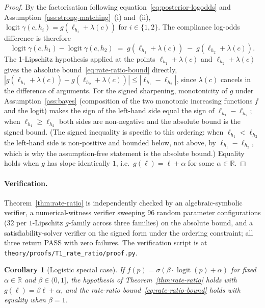 \documentclass[11pt]{article}
\newtheorem{corollary}{Corollary}
\theoremstyle{definition}
\theoremstyle{remark}
\begin{document}
\begin{proof}
By the factorisation following equation~\eqref{eq:posterior-logodds} and
Assumption~\ref{ass:strong-matching}~(i) and~(ii),
$\operatorname{logit} \gamma(c, h_i) = g(\ell_{h_i} + \lambda(c))$ for $i \in \{1, 2\}$.
The compliance log-odds difference is therefore
\[
\operatorname{logit} \gamma(c, h_1) - \operatorname{logit} \gamma(c, h_2)
\;=\; g(\ell_{h_1} + \lambda(c)) \;-\; g(\ell_{h_2} + \lambda(c)).
\]
The 1-Lipschitz hypothesis applied at the points $\ell_{h_1} + \lambda(c)$ and
$\ell_{h_2} + \lambda(c)$ gives the absolute bound~\eqref{eq:rate-ratio-bound}
directly, $|g(\ell_{h_1} + \lambda(c)) - g(\ell_{h_2} + \lambda(c))| \le
|\ell_{h_1} - \ell_{h_2}|$, since $\lambda(c)$ cancels in the difference of arguments.
For the signed sharpening, monotonicity of $g$ under Assumption~\ref{ass:bayes}
(composition of the two monotonic increasing functions $f$ and the logit) makes the
sign of the left-hand side equal the sign of $\ell_{h_1} - \ell_{h_2}$; when
$\ell_{h_1} \ge \ell_{h_2}$ both sides are non-negative and the absolute bound is the
signed bound. (The signed inequality is specific to this ordering: when
$\ell_{h_1} < \ell_{h_2}$ the left-hand side is non-positive and bounded below, not
above, by $\ell_{h_1} - \ell_{h_2}$, which is why the assumption-free statement is the
absolute bound.) Equality holds when $g$ has slope identically $1$, i.e.\
$g(\ell) = \ell + \alpha$ for some $\alpha \in \mathbb{R}$.
\end{proof}

\paragraph{Verification.} Theorem~\ref{thm:rate-ratio} is independently checked
by an algebraic-symbolic verifier, a numerical-witness verifier sweeping $96$ random
parameter configurations ($32$ per $1$-Lipschitz $g$-family across three families)
on the absolute bound, and a satisfiability-solver verifier on the signed form under
the ordering constraint; all three return PASS with zero failures. The verification script is at
\texttt{theory/proofs/T1\_rate\_ratio/proof.py}.

\begin{corollary}[Logistic special case]
\label{cor:logistic-special}
If $f(p) = \sigma(\beta \cdot \operatorname{logit}(p) + \alpha)$ for fixed
$\alpha \in \mathbb{R}$ and $\beta \in (0, 1]$, the hypothesis of
Theorem~\ref{thm:rate-ratio} holds with $g(\ell) = \beta\ell + \alpha$, and the
rate-ratio bound~\eqref{eq:rate-ratio-bound} holds with equality when $\beta=1$.
\end{corollary}
\end{document}

